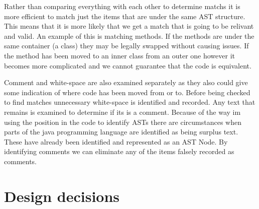 

Rather than comparing everything with each other to determine matchs it is more efficient to match just the items that are under the same AST structure.  This means that it is more likely that we get a match that is going to be relivant and valid.  An example of this is matching methods. If the methods are under the same container (a class) they may be legally swapped without causing issues.  If the method has been moved to an inner class from an outer one however it becomes more complicated and we cannot guarantee that the code is equivalent.     

Comment and white-space are also examined separately as they also could give some indication of where code has been moved from or to.
Before being checked to find matches unnecessary white-space is identified and recorded.
Any text that remains is examined to determine if its is a comment.  Because of the way im using the position in the code to identify ASTs there are circumstances when parts of the java programming language are identified as being surplus text. These have already been identified and represented as an AST Node. By identifying comments we can eliminate any of the items falsely recorded as comments.



% 

\section{Design decisions}

